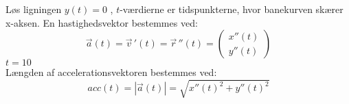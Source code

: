 \documentclass[../main.tex]{subfiles}
\begin{document}
\begin{tcolorbox}[title=Opgave 5,
    colback=blue!1!white,
    colframe=black,
    colbacktitle=blue!25!white,
    coltitle=red!25!black,
    fonttitle=\bfseries,
    subtitle style={boxrule=0.4pt,
    colback=blue!7!white} ]
        Løs ligningen \(y(t)=0\) ,  \(t\)-værdierne er tidspunkterne, hvor banekurven skærer x-aksen.
        En hastighedsvektor bestemmes ved:
        \[\vec{a}(t)=\vec{v}\,'(t) = \vec{r}\, '' (t)=\begin{pmatrix} x''(t) \\ y''(t) \end{pmatrix}\]
        \(t = 10\)\\
        Længden af accelerationsvektoren bestemmes ved:
        \[acc(t)=|\vec{a}(t)|= \sqrt{x''(t)^2+y''(t)^2}\]
\end{tcolorbox}
\vspace*{2 cm}
\end{document}

